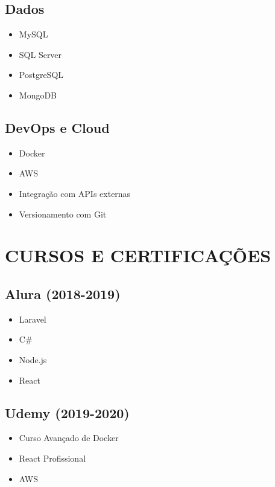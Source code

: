 \documentclass[11pt,a4paper]{article}
\begin{document}
\begin{minipage}[t]{0.48\textwidth}
    \subsection{Dados}
    \begin{itemize}[leftmargin=15pt, topsep=0pt, itemsep=1pt]
        \item MySQL
        \item SQL Server
        \item PostgreSQL
        \item MongoDB
    \end{itemize}
    
    \vspace{8pt}
    
    \subsection{DevOps e Cloud}
    \begin{itemize}[leftmargin=15pt, topsep=0pt, itemsep=1pt]
        \item Docker
        \item AWS
        \item Integração com APIs externas
        \item Versionamento com Git
    \end{itemize}
\end{minipage}

\vspace{15pt}

\section{CURSOS E CERTIFICAÇÕES}

\begin{minipage}[t]{0.48\textwidth}
    \subsection{Alura (2018-2019)}
    \begin{itemize}[leftmargin=15pt, topsep=0pt, itemsep=1pt]
        \item Laravel
        \item C\#
        \item Node.js
        \item React
    \end{itemize}
\end{minipage}
\hfill
\begin{minipage}[t]{0.48\textwidth}
    \subsection{Udemy (2019-2020)}
    \begin{itemize}[leftmargin=15pt, topsep=0pt, itemsep=1pt]
        \item Curso Avançado de Docker
        \item React Profissional
        \item AWS
    \end{itemize}
\end{minipage}
\end{document}
